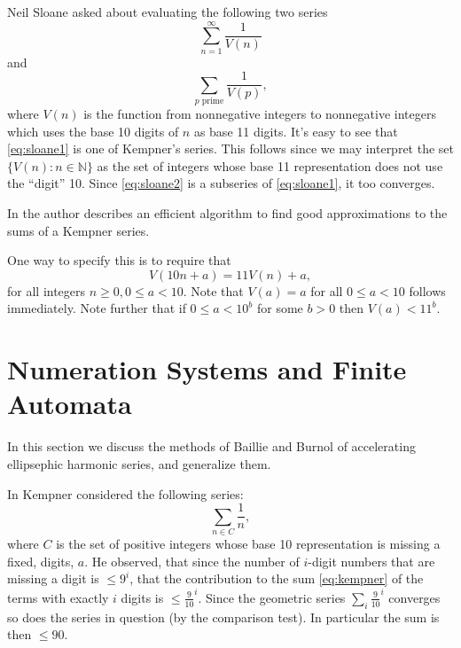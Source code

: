 \documentclass{article}
\newcommand{\NN}{\mathbb{N}}
\begin{document}
Neil Sloane asked about evaluating the following two series
\begin{equation}
  \label{eq:sloane1}
  \sum_{n=1}^\infty \frac{1}{V(n)}
\end{equation}
and
\begin{equation}
  \label{eq:sloane2}
  \sum_{p \text{ prime}} \frac{1}{V(p)},
\end{equation}
where $V(n)$ is the function from nonnegative integers to
nonnegative integers which uses the base 10 digits of $n$ as base 11
digits. It's easy to see that \eqref{eq:sloane1} is one of Kempner's
series.  This follows since we may interpret the set
$\{V(n) : n \in \NN\}$ as the set of integers whose base 11
representation does not use the ``digit'' 10.  Since
\eqref{eq:sloane2} is a subseries of \eqref{eq:sloane1}, it too
converges.

In \cite{baillie1979sums} the author describes an efficient
algorithm to find good approximations to the sums of a Kempner series.

One way to specify this is to require that
\begin{equation}
  \label{eq:basic}
  V(10 n + a) = 11 V(n) + a,
\end{equation}
for all integers $n \ge 0, 0 \le a < 10$. Note that $V(a) = a$ for all
$0 \le a < 10$ follows immediately. Note further that if $0 \le a <
10^b$ for some $b > 0$ then $V(a) < 11^b$.

\section{Numeration Systems and Finite Automata}
\label{sec:numeration}

In this section we discuss the methods of Baillie and Burnol of
accelerating ellipsephic harmonic series, and generalize them.

In \cite{kempner1914curious} Kempner considered the following series:
\begin{equation}
  \label{eq:kempner}
  \sum_{n \in C}\frac{1}{n},
\end{equation}
where $C$ is the set of positive integers whose base 10 representation
is missing a fixed, digits, $a$.
He observed, that since the number
of $i$-digit numbers that are missing a digit is $\le 9^i$, that the
contribution to the sum \eqref{eq:kempner} of the terms with exactly
$i$ digits is $\le \frac{9}{10}^i$. Since the geometric series
$\sum_i \frac{9}{10}^i$ converges so does the series in question (by
the comparison test). In particular the sum is then $\le 90$.
\end{document}
